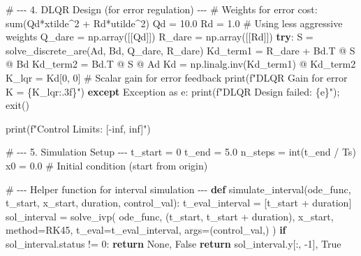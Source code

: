 \documentclass[
  letterpaper,
  DIV=11,
  numbers=noendperiod,
  oneside]{scrartcl}
\newenvironment{Shaded}{\begin{snugshade}}{\end{snugshade}}
\newcommand{\BuiltInTok}[1]{\textcolor[rgb]{0.00,0.23,0.31}{#1}}
\newcommand{\CommentTok}[1]{\textcolor[rgb]{0.37,0.37,0.37}{#1}}
\newcommand{\ControlFlowTok}[1]{\textcolor[rgb]{0.00,0.23,0.31}{\textbf{#1}}}
\newcommand{\DecValTok}[1]{\textcolor[rgb]{0.68,0.00,0.00}{#1}}
\newcommand{\FloatTok}[1]{\textcolor[rgb]{0.68,0.00,0.00}{#1}}
\newcommand{\ImportTok}[1]{\textcolor[rgb]{0.00,0.46,0.62}{#1}}
\newcommand{\KeywordTok}[1]{\textcolor[rgb]{0.00,0.23,0.31}{\textbf{#1}}}
\newcommand{\NormalTok}[1]{\textcolor[rgb]{0.00,0.23,0.31}{#1}}
\newcommand{\OperatorTok}[1]{\textcolor[rgb]{0.37,0.37,0.37}{#1}}
\newcommand{\PreprocessorTok}[1]{\textcolor[rgb]{0.68,0.00,0.00}{#1}}
\newcommand{\SpecialCharTok}[1]{\textcolor[rgb]{0.37,0.37,0.37}{#1}}
\newcommand{\SpecialStringTok}[1]{\textcolor[rgb]{0.13,0.47,0.30}{#1}}
\newcommand{\StringTok}[1]{\textcolor[rgb]{0.13,0.47,0.30}{#1}}
\newcommand{\VariableTok}[1]{\textcolor[rgb]{0.07,0.07,0.07}{#1}}
\begin{document}
\begin{Shaded}
\begin{Highlighting}[]
\CommentTok{\# {-}{-}{-} 4. DLQR Design (for error regulation) {-}{-}{-}}
\CommentTok{\# Weights for error cost: sum(Qd*xtilde\^{}2 + Rd*utilde\^{}2)}
\NormalTok{Qd }\OperatorTok{=} \FloatTok{10.0}
\NormalTok{Rd }\OperatorTok{=} \FloatTok{1.0} \CommentTok{\# Using less aggressive weights}
\NormalTok{Q\_dare }\OperatorTok{=}\NormalTok{ np.array([[Qd]])}
\NormalTok{R\_dare }\OperatorTok{=}\NormalTok{ np.array([[Rd]])}
\ControlFlowTok{try}\NormalTok{:}
\NormalTok{    S }\OperatorTok{=}\NormalTok{ solve\_discrete\_are(Ad, Bd, Q\_dare, R\_dare)}
\NormalTok{    Kd\_term1 }\OperatorTok{=}\NormalTok{ R\_dare }\OperatorTok{+}\NormalTok{ Bd.T }\OperatorTok{@}\NormalTok{ S }\OperatorTok{@}\NormalTok{ Bd}
\NormalTok{    Kd\_term2 }\OperatorTok{=}\NormalTok{ Bd.T }\OperatorTok{@}\NormalTok{ S }\OperatorTok{@}\NormalTok{ Ad}
\NormalTok{    Kd }\OperatorTok{=}\NormalTok{ np.linalg.inv(Kd\_term1) }\OperatorTok{@}\NormalTok{ Kd\_term2}
\NormalTok{    K\_lqr }\OperatorTok{=}\NormalTok{ Kd[}\DecValTok{0}\NormalTok{, }\DecValTok{0}\NormalTok{] }\CommentTok{\# Scalar gain for error feedback}
    \BuiltInTok{print}\NormalTok{(}\SpecialStringTok{f"DLQR Gain for error K = }\SpecialCharTok{\{}\NormalTok{K\_lqr}\SpecialCharTok{:.3f\}}\SpecialStringTok{"}\NormalTok{)}
\ControlFlowTok{except} \PreprocessorTok{Exception} \ImportTok{as}\NormalTok{ e:}
    \BuiltInTok{print}\NormalTok{(}\SpecialStringTok{f"DLQR Design failed: }\SpecialCharTok{\{}\NormalTok{e}\SpecialCharTok{\}}\SpecialStringTok{"}\NormalTok{)}\OperatorTok{;}\NormalTok{ exit()}


\BuiltInTok{print}\NormalTok{(}\SpecialStringTok{f"Control Limits: [{-}inf, inf]"}\NormalTok{)}

\CommentTok{\# {-}{-}{-} 5. Simulation Setup {-}{-}{-}}
\NormalTok{t\_start }\OperatorTok{=} \DecValTok{0}
\NormalTok{t\_end }\OperatorTok{=} \FloatTok{5.0}
\NormalTok{n\_steps }\OperatorTok{=} \BuiltInTok{int}\NormalTok{(t\_end }\OperatorTok{/}\NormalTok{ Ts)}
\NormalTok{x0 }\OperatorTok{=} \FloatTok{0.0} \CommentTok{\# Initial condition (start from origin)}

\CommentTok{\# {-}{-}{-} Helper function for interval simulation {-}{-}{-}}
\KeywordTok{def}\NormalTok{ simulate\_interval(ode\_func, t\_start, x\_start, duration, control\_val):}
\NormalTok{    t\_eval\_interval }\OperatorTok{=}\NormalTok{ [t\_start }\OperatorTok{+}\NormalTok{ duration]}
\NormalTok{    sol\_interval }\OperatorTok{=}\NormalTok{ solve\_ivp(}
\NormalTok{        ode\_func, (t\_start, t\_start }\OperatorTok{+}\NormalTok{ duration), x\_start, method}\OperatorTok{=}\StringTok{\textquotesingle{}RK45\textquotesingle{}}\NormalTok{,}
\NormalTok{        t\_eval}\OperatorTok{=}\NormalTok{t\_eval\_interval, args}\OperatorTok{=}\NormalTok{(control\_val,)}
\NormalTok{    )}
    \ControlFlowTok{if}\NormalTok{ sol\_interval.status }\OperatorTok{!=} \DecValTok{0}\NormalTok{: }\ControlFlowTok{return} \VariableTok{None}\NormalTok{, }\VariableTok{False}
    \ControlFlowTok{return}\NormalTok{ sol\_interval.y[:, }\OperatorTok{{-}}\DecValTok{1}\NormalTok{], }\VariableTok{True}


\end{Highlighting}
\end{Shaded}
\end{document}
